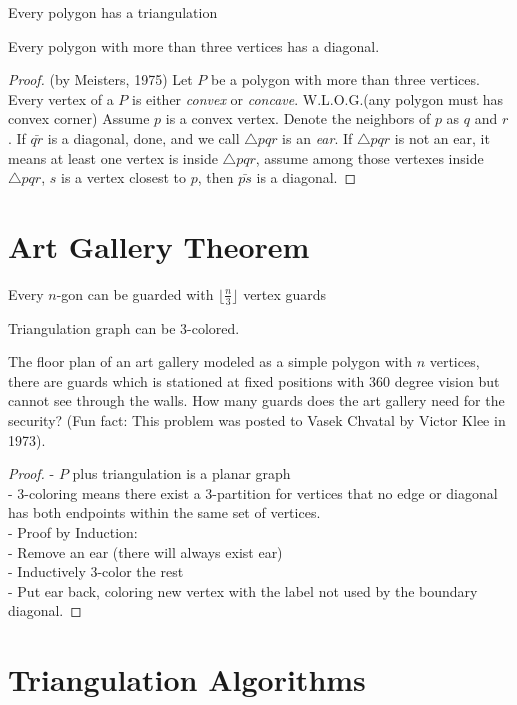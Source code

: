 			\begin{theorem}
				Every polygon has a triangulation				
			\end{theorem}

			\begin{lemma}
				Every polygon with more than three vertices has a diagonal.
			\end{lemma}

			\begin{proof}
				(by Meisters, 1975) Let $P$ be a polygon with more than three vertices. Every vertex of a $P$ is either \textit{convex} or \textit{concave}. W.L.O.G.(any polygon must has convex corner) Assume $p$ is a convex vertex. Denote the neighbors of $p$ as $q$ and $r$. If $\bar{qr}$ is a diagonal, done, and we call $\triangle{pqr}$ is an \textit{ear}. If $\triangle{pqr}$ is not an ear, it means at least one vertex is inside $\triangle{pqr}$, assume among those vertexes inside $\triangle{pqr}$, $s$ is a vertex closest to $p$, then $\bar{ps}$ is a diagonal.
			\end{proof}
			
		\section{Art Gallery Theorem}
			\begin{theorem}
				Every $n$-gon can be guarded with $\lfloor \frac{n}{3} \rfloor$ vertex guards
			\end{theorem}

			\begin{lemma}
				Triangulation graph can be 3-colored.
			\end{lemma}

			\begin{problem}
				The floor plan of an art gallery modeled as a simple polygon with $n$ vertices, there are guards which is stationed at fixed positions with 360 degree vision but cannot see through the walls. How many guards does the art gallery need for the security? (Fun fact: This problem was posted to Vasek Chvatal by Victor Klee in 1973).				
			\end{problem}

			\begin{proof}
				- $P$ plus triangulation is a planar graph\\
				- 3-coloring means there exist a 3-partition for vertices that no edge or diagonal has both endpoints within the same set of vertices.\\
				- Proof by Induction:\\
				\indent - Remove an ear (there will always exist ear) \\
				\indent - Inductively 3-color the rest\\
				\indent - Put ear back, coloring new vertex with the label not used by the boundary diagonal.
			\end{proof}

		\section{Triangulation Algorithms}